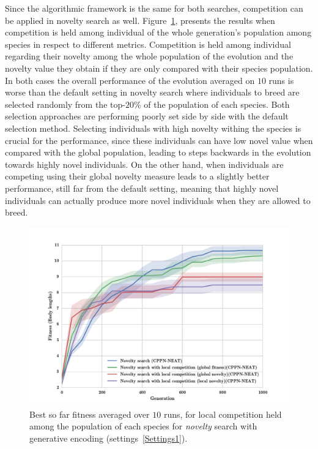 Since the algorithmic framework is the same for both searches, competition can be applied in novelty search as well. Figure~\ref{fig:NoveltyCompetitionsSize5}, presents the results when competition is held among individual of the whole generation's population among species in respect to different metrics. Competition is held among individual regarding their novelty among the whole population of the evolution and the novelty value they obtain if they are only compared with their species population. In both cases the overall performance of the evolution averaged on $10$ runs is worse than the default setting in novelty search where individuals to breed are selected randomly from the top-$20\%$ of the population of each species. Both selection approaches are performing poorly set side by side with the default selection method. Selecting individuals with high novelty withing the species is crucial for the performance, since these individuals can have low novel value when compared with the global population, leading to steps backwards in the evolution towards highly novel individuals. On the other hand, when individuals are competing using their global novelty measure leads to a slightly better performance, still far from the default setting, meaning that highly novel individuals can actually produce more novel individuals when they are allowed to breed.


\begin{figure}[t!]
\centering
\includegraphics[width=1.0\textwidth]{../Figures/Results/NoveltyCompetitionsSize5.pdf}
\caption{Best so far fitness averaged over $10$ runs, for local competition held among the population of each species for \emph{novelty} search with generative encoding (settings~\ref{Settings1}).}
\label{fig:NoveltyCompetitionsSize5}
\end{figure}



